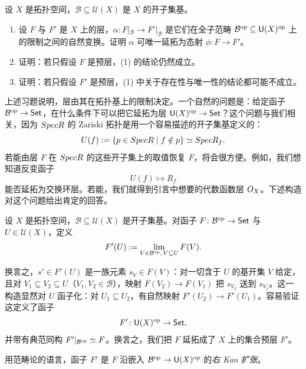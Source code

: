 \begin{exercise}\label{exc:1.2.7}
设 $X$ 是拓扑空间，$\mathcal B\subseteq\mathcal U(X)$ 是 $X$ 的开子集基。
\begin{enumerate}[label=(\arabic*),leftmargin=2em,itemsep=0.25ex]
  \item 设 $F$ 与 $F'$ 是 $X$ 上的层，$\alpha\colon F|_{\mathcal B}\to F'|_{\mathcal B}$ 是它们在全子范畴 $\mathcal B^{\mathrm{op}}\subseteq\mathsf{U}(X)^{\mathrm{op}}$ 上的限制之间的自然变换。证明 $\alpha$ 可唯一延拓为态射 $\phi\colon F\to F'$。
  \item 证明：若只假设 $F$ 是预层，(1) 的结论仍然成立。
  \item 证明：若只假设 $F'$ 是预层，(1) 中关于存在性与唯一性的结论都可能不成立。
\end{enumerate}
\end{exercise}

上述习题说明，层由其在拓扑基上的限制决定。一个自然的问题是：给定函子 $\mathcal B^{\mathrm{op}}\to\mathsf{Set}$，在什么条件下可以把它延拓为层 $\mathsf{U}(X)^{\mathrm{op}}\to\mathsf{Set}$？这个问题与我们相关，因为 $Spec R$ 的 Zariski 拓扑是用一个容易描述的开子集基定义的：
\[
U(f):=\{p\in Spec R\mid f\notin p\}\simeq Spec R_f.
\]
若能由层 $F$ 在 $Spec R$ 的这些开子集上的取值恢复 $F$，将会很方便。例如，我们想知道反变函子
\[
U(f)\mapsto R_f
\]
能否延拓为交换环层。若能，我们就得到引言中想要的代数函数层 $O_X$。下述构造对这个问题给出肯定的回答。

\begin{construction}\label{con:1.2.8}
设 $X$ 是拓扑空间，$\mathcal B\subseteq\mathcal U(X)$ 是开子集基。对函子 $F\colon\mathcal B^{\mathrm{op}}\to\mathsf{Set}$ 与 $U\in\mathcal U(X)$，定义
\[
F'(U):=\lim_{V\in\mathcal B^{\mathrm{op}},\,V\subseteq U}F(V).
\]
\end{construction}

换言之，$s'\in F'(U)$ 是一族元素 $s_V\in F(V)$：对一切含于 $U$ 的基开集 $V$ 给定，且对 $V_1\subseteq V_2\subseteq U$（$V_1,V_2\in\mathcal B$），映射 $F(V_2)\to F(V_1)$ 把 $s_{V_2}$ 送到 $s_{V_1}$。这一构造显然对 $U$ 函子化：对 $U_1\subseteq U_2$，有自然映射 $F'(U_2)\to F'(U_1)$。容易验证这定义了函子
\[
F'\colon\mathsf{U}(X)^{\mathrm{op}}\to\mathsf{Set},
\]
并带有典范同构 $F'|_{\mathcal B^{\mathrm{op}}}\simeq F$。换言之，我们把 $F$ 延拓成了 $X$ 上的集合预层 $F'$。

\begin{remark}\label{rem:1.2.9}
用范畴论的语言，函子 $F'$ 是 $F$ 沿嵌入 $\mathcal B^{\mathrm{op}}\to\mathsf{U}(X)^{\mathrm{op}}$ 的\emph{右 Kan 扩张}。
\end{remark}

